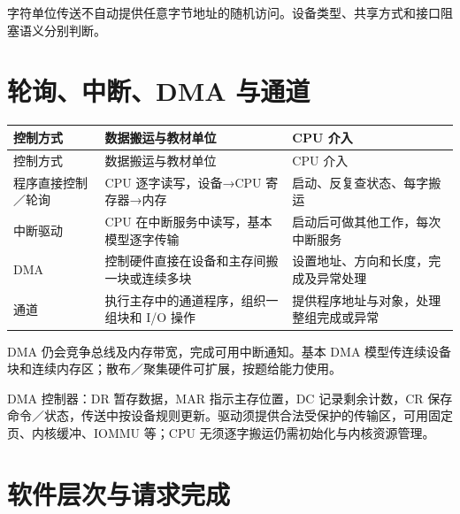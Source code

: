字符单位传送不自动提供任意字节地址的随机访问。设备类型、共享方式和接口阻塞语义分别判断。

\section{轮询、中断、DMA 与通道}\label{OS05-control}

\par\smallskip
\begin{wideblock}
{\fontsize{9.3}{12}\selectfont\setlength{\tabcolsep}{2.5pt}\setlength{\LTleft}{0pt}\setlength{\LTright}{0pt}
\begin{longtable}{@{}>{\raggedright\arraybackslash}p{}>{\raggedright\arraybackslash}p{}>{\raggedright\arraybackslash}p{}@{}}
\toprule
控制方式 & 数据搬运与教材单位 & CPU 介入 \\

\midrule\endfirsthead\toprule
控制方式 & 数据搬运与教材单位 & CPU 介入 \\

\midrule\endhead\bottomrule\endfoot
程序直接控制／轮询 & CPU 逐字读写，设备→CPU 寄存器→内存 & 启动、反复查状态、每字搬运 \\

中断驱动 & CPU 在中断服务中读写，基本模型逐字传输 & 启动后可做其他工作，每次中断服务 \\

DMA & 控制硬件直接在设备和主存间搬一块或连续多块 & 设置地址、方向和长度，完成及异常处理 \\

通道 & 执行主存中的通道程序，组织一组块和 I/O 操作 & 提供程序地址与对象，处理整组完成或异常 \\

\end{longtable}}
\end{wideblock}
\par\smallskip

DMA 仍会竞争总线及内存带宽，完成可用中断通知。基本 DMA 模型传连续设备块和连续内存区；散布／聚集硬件可扩展，按题给能力使用。

DMA 控制器：DR 暂存数据，MAR 指示主存位置，DC 记录剩余计数，CR 保存命令／状态，传送中按设备规则更新。驱动须提供合法受保护的传输区，可用固定页、内核缓冲、IOMMU 等；CPU 无须逐字搬运仍需初始化与内核资源管理。

\section{软件层次与请求完成}\label{OS05-software}

